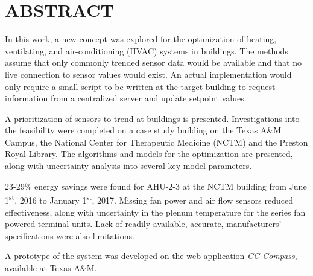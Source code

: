 %
%
%

\chapter*{\texorpdfstring{\MakeUppercase{ABSTRACT}}{ABSTRACT}}

\pagestyle{plain} %
\setcounter{page}{2}

\indent  In this work, a new concept was explored for the optimization
of heating, ventilating, and air-conditioning (HVAC) systems in
buildings. The methods assume that only commonly trended sensor data
would be available and that no live connection to sensor values would
exist.  An actual implementation would only require a small script to be
written at the target building to request information from a centralized
server and update setpoint values. 

A prioritization of sensors to trend at buildings is presented.
Investigations into the feasibility were completed on a case study
building on the Texas A\&M Campus, the National Center for Therapeutic
Medicine (NCTM) and the Preston Royal Library. The algorithms and models
for the optimization are presented, along with uncertainty analysis into
several key model parameters. 

23-29\% energy savings were found for AHU-2-3 at the NCTM
building from June 1\textsuperscript{st}, 2016 to January
1\textsuperscript{st}, 2017.  Missing fan power and air flow sensors
reduced effectiveness, along with uncertainty in the plenum temperature
for the series fan powered terminal units. Lack of readily available,
accurate, manufacturers' specifications were also limitations.  

A prototype of the system was developed on the web application
\textit{CC-Compass}, available at Texas A\&M. 

\pagebreak{}
